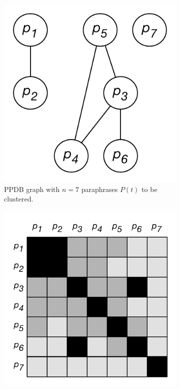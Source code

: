 \documentclass[11pt]{article}
\begin{document}
\begin{figure}
	\begin{subfigure}[t]{0.25\textwidth}
		\includegraphics[width=\textwidth]{images/pp_graph.pdf}
		\caption{PPDB graph with $n=7$ paraphrases $P(t)$ to be clustered.}
		\label{fig:ppgraph}
	\end{subfigure}
	\hfill%
	\begin{subfigure}[t]{0.36\textwidth}
		\includegraphics[width=\textwidth]{images/pp_mat_all.pdf}

\end{subfigure}
\end{figure}
\end{document}
